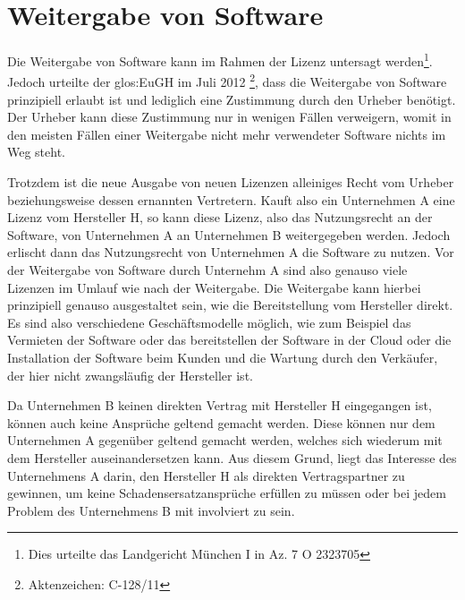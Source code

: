 \section{Weitergabe von Software}
Die Weitergabe von Software kann im Rahmen der Lizenz untersagt werden\footnote{Dies urteilte das Landgericht München I in Az. 7 O 23237\/05}.
Jedoch urteilte der \gls{glos:EuGH} im Juli 2012 \footnote{Aktenzeichen: C-128/11 }, dass die Weitergabe von Software prinzipiell erlaubt ist und lediglich eine Zustimmung durch den Urheber benötigt.
Der Urheber kann diese Zustimmung nur in wenigen Fällen verweigern, womit in den meisten Fällen einer Weitergabe nicht mehr verwendeter Software nichts im Weg steht.\par
Trotzdem ist die neue Ausgabe von neuen Lizenzen alleiniges Recht vom Urheber beziehungsweise dessen ernannten Vertretern.
Kauft also ein Unternehmen A eine Lizenz vom Hersteller H, so kann diese Lizenz, also das Nutzungsrecht an der Software, von Unternehmen A an Unternehmen B weitergegeben werden.
Jedoch erlischt dann das Nutzungsrecht von Unternehmen A die Software zu nutzen.
Vor der Weitergabe von Software durch Unternehm A sind also genauso viele Lizenzen im Umlauf wie nach der Weitergabe.
Die Weitergabe kann hierbei prinzipiell genauso ausgestaltet sein, wie die Bereitstellung vom Hersteller direkt.
Es sind also verschiedene Geschäftsmodelle möglich, wie zum Beispiel das Vermieten der Software oder das bereitstellen der Software in der Cloud oder die Installation der Software beim Kunden und die Wartung durch den Verkäufer, der hier nicht zwangsläufig der Hersteller ist.\par
Da Unternehmen B keinen direkten Vertrag mit Hersteller H eingegangen ist, können auch keine Ansprüche geltend gemacht werden.
Diese können nur dem Unternehmen A gegenüber geltend gemacht werden, welches sich wiederum mit dem Hersteller auseinandersetzen kann.
Aus diesem Grund, liegt das Interesse des Unternehmens A darin, den Hersteller H als direkten Vertragspartner zu gewinnen, um keine Schadensersatzansprüche erfüllen zu müssen oder bei jedem Problem des Unternehmens B mit involviert zu sein.

